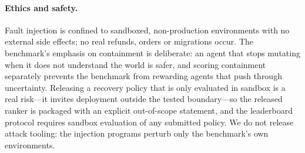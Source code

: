 \paragraph{Ethics and safety.} Fault injection is confined to sandboxed, non-production
environments with no external side effects; no real refunds, orders or migrations occur. The
benchmark's emphasis on containment is deliberate: an agent that stops mutating when it does not
understand the world is safer, and scoring containment separately prevents the benchmark from
rewarding agents that push through uncertainty. Releasing a recovery policy that is only evaluated
in sandbox is a real risk---it invites deployment outside the tested boundary---so the released
ranker is packaged with an explicit out-of-scope statement, and the leaderboard protocol requires
sandbox evaluation of any submitted policy. We do not release attack tooling: the injection
programs perturb only the benchmark's own environments.
